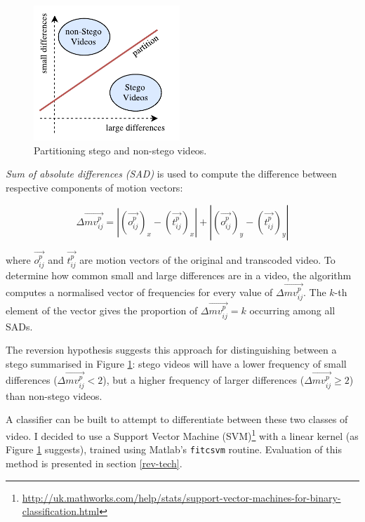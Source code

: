 \documentclass[12pt,british,twoside,notitlepage,usenames,dvipsnames,hypens,final]{report}
\numberwithin{equation}{section}
\numberwithin{figure}{section}
\begin{document}
\begin{figure}
\vspace{-15pt}
\centering
\includegraphics[width=5.5cm]{img/movest_reversion_sketch.pdf}
\caption{Partitioning stego and non-stego videos.}
\label{fig:movest-reversion-sketch}
\end{figure}

\emph{Sum of absolute differences (SAD)} is used to compute the difference between respective components of motion vectors:

$$ \Delta \overrightarrow{mv^p_{ij}} = |(\overrightarrow{o^p_{ij}})_x - (\overrightarrow{t^p_{ij}})_x| +  |(\overrightarrow{o^p_{ij}})_y - (\overrightarrow{t^p_{ij}})_y|$$

where $\overrightarrow{o^p_{ij}}$ and $\overrightarrow{t^p_{ij}}$ are motion vectors of the original and transcoded video. To determine how common small and large differences are in a video, the algorithm computes a normalised vector of frequencies for every value of $\Delta\overrightarrow{mv^p_{ij}}$. The $k$-th element of the vector gives the proportion of $\Delta\overrightarrow{mv^p_{ij}} = k$ occurring among all SADs.

The reversion hypothesis suggests this approach for distinguishing between a stego summarised in Figure \ref{fig:movest-reversion-sketch}: stego videos will have a lower frequency of small differences ($\Delta\overrightarrow{mv^p_{ij}} < 2$), but a higher frequency of larger differences ($\Delta\overrightarrow{mv^p_{ij}} \geq 2$) than non-stego videos.

A classifier can be built to attempt to differentiate between these two classes of video. I decided to use a Support Vector Machine (SVM)\footnote{\url{http://uk.mathworks.com/help/stats/support-vector-machines-for-binary-classification.html}} with a linear kernel (as Figure \ref{fig:movest-reversion-sketch} suggests), trained using Matlab's \texttt{fitcsvm} routine. Evaluation of this method is presented in section \ref{rev-tech}.
\end{document}
